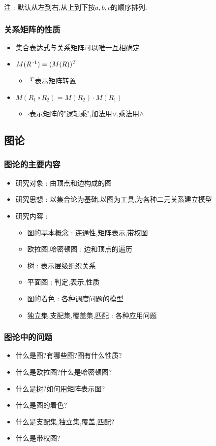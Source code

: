 {{{  注 : 默认从左到右,从上到下按$a,b,c$的顺序排列.
}%

\subsubsection{关系矩阵的性质}{
  \begin{itemize}
    \item 集合表达式与关系矩阵可以唯一互相确定
    \item $M(R\operatorname{^{-1}}) = (M(R))^T$\begin{itemize}
            \item $~^T$表示矩阵转置
          \end{itemize}
    \item $M(R_1 \circ R_2) = M(R_2) \cdot M(R_1)$\begin{itemize}
            \item $\cdot$表示矩阵的"逻辑乘",加法用$\vee$,乘法用$\wedge$
          \end{itemize}
  \end{itemize}
}%

}%

\subsection{图论}{

  \subsubsection{图论的主要内容}{
    \begin{itemize}
      \item 研究对象 : 由顶点和边构成的图
      \item 研究思想 : 以集合论为基础,以图为工具,为各种二元关系建立模型
      \item 研究内容 : \begin{itemize}
              \item 图的基本概念 : 连通性,矩阵表示,带权图
              \item 欧拉图,哈密顿图 : 边和顶点的遍历
              \item 树 : 表示层级组织关系
              \item 平面图 : 判定,表示,性质
              \item 图的着色 : 各种调度问题的模型
              \item 独立集,支配集,覆盖集,匹配 : 各种应用问题
            \end{itemize}
    \end{itemize}
  }%

  \subsubsection{图论中的问题}{
    \begin{itemize}
      \item 什么是图?有哪些图?图有什么性质?
      \item 什么是欧拉图?什么是哈密顿图?
      \item 什么是树?如何用矩阵表示图?
      \item 什么是图的着色?
      \item 什么是支配集,独立集,覆盖,匹配?
      \item 什么是带权图?
    \end{itemize}
  }%

}%

}%